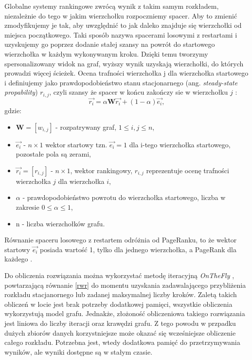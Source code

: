 Globalne systemy rankingowe zwrócą wynik z takim samym rozkładem, niezależnie do tego w jakim wierzchołku rozpoczniemy spacer. Aby to zmienić zmodyfikujemy je tak, aby uwzględnić to jak daleko znajduje się wierzchołki od miejsca początkowego. Taki sposób nazywa spacerami losowymi z restartami i uzyskujemy go poprzez dodanie stałej szansy na powrót do startowego wierzchołka w każdym wykonywanym kroku. Dzięki temu tworzymy spersonalizowany widok na graf, wyższy wynik uzyskają wierzchołki, do których prowadzi więcej ścieżek. Ocena trafności wierzchołka j dla wierzchołka startowego i definiujemy jako prawdopodobieństwo stanu stacjonarnego (ang. \textit{steady-state propability}) $r_{i,j}$, czyli szansy że spacer w końcu zakończy sie w wierzchołku $j$ \cite{FastRandomWalkwithRestartandItsApplications}:
\begin{equation}
\label{rwr}
    \overrightarrow{r_{i}} = \alpha \textbf{W}\overrightarrow{r_{i}} + (1 - \alpha) \overrightarrow{e_{i}},
\end{equation}
gdzie:
\begin{itemize}
    \item $\textbf{W}=[w_{i,j}] $  - rozpatrywany graf, $1 \leq i, j \leq n$,
    \item $\overrightarrow{e_{i}}$ - $n \times 1$ wektor startowy tzn. $\overrightarrow{e_{i}}=1$ dla i-tego wierzchołka startowego, pozostałe pola są zerami,
    \item $ \overrightarrow{r_{i}}= [r_{i,j}] $ - $n \times 1$, wektor rankingowy, $r_{i,j}$ reprezentuje ocenę trafności wierzchołka $j$ dla wierzchołka $i$,
    \item $\alpha$ - prawdopodobieństwo powrotu do wierzchołka startowego, liczba w zakresie $0 \leq \alpha \leq 1$,
    \item n - liczba wierzchołków grafu.
\end{itemize}

Równanie spaceru losowego z restartem odróżnia od PageRanku, to że wektor startowy $\overrightarrow{e_{i}}$ posiada wartość 1, tylko dla jednego wierzchołka, a PageRank dla każdego \cite{RandomWalkwithRestartanditsapplications}.

Do obliczenia rozwiązania można wykorzystać metodę iteracyjną \textit{OnTheFly} \cite{FastRandomWalkwithRestartandItsApplications}, powtarzającą równanie \ref{rwr} do momentu uzyskania zadawalającego przybliżenia rozkładu stacjanornego lub zadanej maksymalnej liczby kroków. Zaletą takich obliczeń w locie jest brak potrzeby dodatkowej pamięci, wszystkie obliczenia wykorzystują model grafu. Jednakże, złożoność obliczeniowa takiego rozwiązania jest liniowa do liczby iteracji oraz krawędzi grafu. Z tego powodu w przpadku dużych zbiorów danych korzystniejsze może okazać się wcześniejsze obliczenie całego rozkładu. Potrzebna jest, wtedy dodatkowa pamięć do przetrzymywania wyników, ale wyniki dostępne są w stałym czasie.


